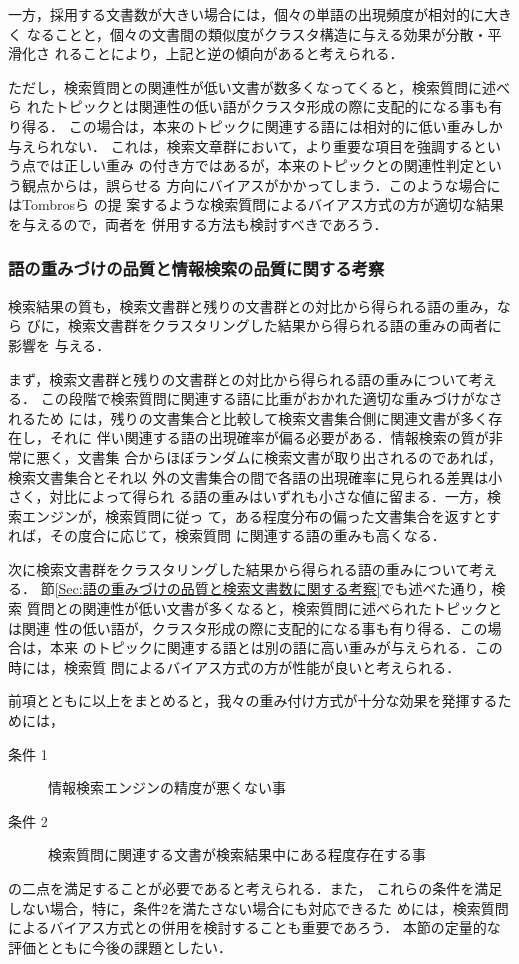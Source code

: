 一方，採用する文書数が大きい場合には，個々の単語の出現頻度が相対的に大きく
なることと，個々の文書間の類似度がクラスタ構造に与える効果が分散・平滑化さ
れることにより，上記と逆の傾向があると考えられる．

ただし，検索質問との関連性が低い文書が数多くなってくると，検索質問に述べら
れたトピックとは関連性の低い語がクラスタ形成の際に支配的になる事も有り得る．
この場合は，本来のトピックに関連する語には相対的に低い重みしか与えられない．
これは，検索文章群において，より重要な項目を強調するという点では正しい重み
の付き方ではあるが，本来のトピックとの関連性判定という観点からは，誤らせる
方向にバイアスがかかってしまう．このような場合にはTombrosら
\cite{Tombros:AdvantagesOfQueryBiasedSummariesInInformationRetrieval}の提
案するような検索質問によるバイアス方式の方が適切な結果を与えるので，両者を
併用する方法も検討すべきであろう．


\subsubsection{語の重みづけの品質と情報検索の品質に関する考察}

検索結果の質も，検索文書群と残りの文書群との対比から得られる語の重み，なら
びに，検索文書群をクラスタリングした結果から得られる語の重みの両者に影響を
与える．

まず，検索文書群と残りの文書群との対比から得られる語の重みについて考える．
この段階で検索質問に関連する語に比重がおかれた適切な重みづけがなされるため
には，残りの文書集合と比較して検索文書集合側に関連文書が多く存在し，それに
伴い関連する語の出現確率が偏る必要がある．情報検索の質が非常に悪く，文書集
合からほぼランダムに検索文書が取り出されるのであれば，検索文書集合とそれ以
外の文書集合の間で各語の出現確率に見られる差異は小さく，対比によって得られ
る語の重みはいずれも小さな値に留まる．一方，検索エンジンが，検索質問に従っ
て，ある程度分布の偏った文書集合を返すとすれば，その度合に応じて，検索質問
に関連する語の重みも高くなる．

次に検索文書群をクラスタリングした結果から得られる語の重みについて考える．
節\ref{Sec:語の重みづけの品質と検索文書数に関する考察}でも述べた通り，検索
質問との関連性が低い文書が多くなると，検索質問に述べられたトピックとは関連
性の低い語が，クラスタ形成の際に支配的になる事も有り得る．この場合は，本来
のトピックに関連する語とは別の語に高い重みが与えられる．この時には，検索質
問によるバイアス方式の方が性能が良いと考えられる．

前項とともに以上をまとめると，我々の重み付け方式が十分な効果を発揮するためには，
\begin{description}
 \item[条件 1] 情報検索エンジンの精度が悪くない事
 \item[条件 2] 検索質問に関連する文書が検索結果中にある程度存在する事
\end{description}
の二点を満足することが必要であると考えられる．また，
これらの条件を満足しない場合，特に，条件2を満たさない場合にも対応できるた
めには，検索質問によるバイアス方式との併用を検討することも重要であろう．
本節の定量的な評価とともに今後の課題としたい．


